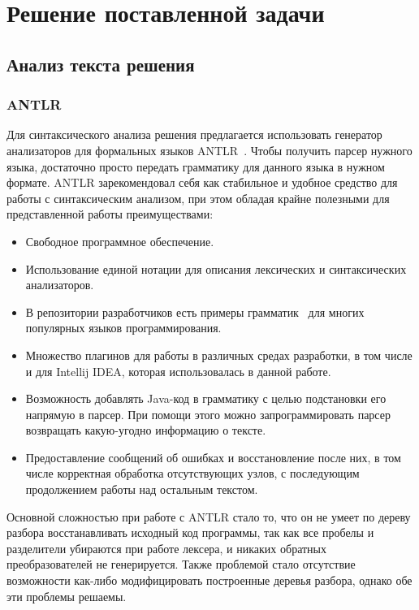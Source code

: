 \chapter{Решение поставленной задачи}

\section{Анализ текста решения}

\subsection{ANTLR}
Для синтаксического анализа решения предлагается использовать генератор анализаторов для формальных языков ANTLR~\cite{antlr-site, antlr-doc}.
Чтобы получить парсер нужного языка, достаточно просто передать грамматику для данного языка в нужном формате.
ANTLR зарекомендовал себя как стабильное и удобное средство для работы с синтаксическим анализом, при этом
обладая крайне полезными для представленной работы преимуществами:
\begin{itemize}
    \item Свободное программное обеспечение.
    \item Использование единой нотации для описания лексических и синтаксических анализаторов.
    \item В репозитории разработчиков есть примеры грамматик~\cite{antlr-grammar} для многих популярных языков программирования.
    \item Множество плагинов для работы в различных средах разработки, в том числе и для Intellij IDEA, которая
        использовалась в данной работе.
    \item Возможность добавлять Java-код в грамматику с целью подстановки его напрямую в парсер. При помощи этого 
        можно запрограммировать парсер возвращать какую-угодно информацию о тексте.
    \item Предоставление сообщений об ошибках и восстановление после них, в том числе корректная обработка отсутствующих узлов, 
        с последующим продолжением работы над остальным текстом. 
\end{itemize} 

Основной сложностью при работе с ANTLR стало то, что он не умеет по дереву разбора восстанавливать исходный код программы, так
как все пробелы и разделители убираются при работе лексера, и никаких обратных преобразователей не генерируется. Также проблемой
стало отсутствие возможности как-либо модифицировать построенные деревья разбора, однако обе эти проблемы решаемы.

